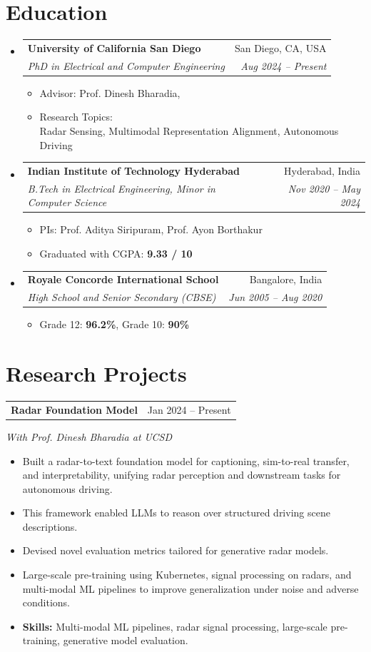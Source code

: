 \documentclass[10pt, letterpaper]{article}
\makeatletter
\newenvironment{highlights}{
    \begin{itemize}[
        topsep=0.10 cm,
        parsep=0.10 cm,
        partopsep=0pt,
        itemsep=0pt,
        leftmargin=0.4 cm + 10pt
    ]
}{
    \end{itemize}
} %
\let\hrefWithoutArrow\href
\renewcommand{\href}[2]{\hrefWithoutArrow{#1}{\ifthenelse{\equal{#2}{}}{ }{#2 }\raisebox{.15ex}{\footnotesize \faExternalLink*}}}
\newcommand{\eduHeading}[4]{
  \item
  \begin{tabular*}{0.97\textwidth}[t]{l@{\extracolsep{\fill}}r}
    \textbf{#1} & #2 \\
    \textit{\small#3} & \textit{\small #4} \\
  \end{tabular*}
}
\newcommand{\eduItemListStart}{
  \begin{itemize}[leftmargin=0.35in, itemsep=0pt, topsep=2pt]
}
\newcommand{\eduItemListEnd}{\end{itemize}}
\newenvironment{projectentry}[3]{%
  \onecolentry
  \begin{tabular*}{\textwidth}{@{\extracolsep{\fill}} l r}
    \textbf{#1} & #2 \\
  \end{tabular*}
  \textit{#3} \par
  \vspace{0.2em} %
}{%
  \endonecolentry
}
\makeatother
\begin{document}
\section{Education}
  \begin{itemize}[leftmargin=0.15in, label={}]

    \eduHeading
        {University of California San Diego}{San Diego, CA, USA}
        {PhD in Electrical and Computer Engineering}{Aug 2024 -- Present}
    \eduItemListStart
        \item Advisor: Prof. Dinesh Bharadia, \href{https://wcsng.ucsd.edu/}{WCSNG Lab}
        \item {
            Research Topics: \\
            Radar Sensing, Multimodal Representation Alignment, Autonomous Driving
        }
    \eduItemListEnd

    \eduHeading
        {Indian Institute of Technology Hyderabad}{Hyderabad, India}
        {B.Tech in Electrical Engineering, Minor in Computer Science}{Nov 2020 -- May 2024}
    \eduItemListStart
        \item PIs: Prof. Aditya Siripuram, Prof. Ayon Borthakur
        \item Graduated with CGPA: \textbf{9.33 / 10}
    \eduItemListEnd

    \eduHeading
        {Royale Concorde International School}{Bangalore, India}
        {High School and Senior Secondary (CBSE)}{Jun 2005 -- Aug 2020}
    \eduItemListStart
        \item Grade 12: \textbf{96.2\%}, Grade 10: \textbf{90\%}
    \eduItemListEnd

  \end{itemize}


\section{Research Projects}

\begin{projectentry}{Radar Foundation Model}{Jan 2024 -- Present}{With Prof. Dinesh Bharadia at UCSD}
    \begin{highlights}
        \item Built a radar-to-text foundation model for captioning, sim-to-real transfer, and interpretability, unifying radar perception and downstream tasks for autonomous driving.
        \item This framework enabled LLMs to reason over structured driving scene descriptions.
        \item Devised novel evaluation metrics tailored for generative radar models.
        \item Large-scale pre-training using Kubernetes, signal processing on radars, and multi-modal ML pipelines to improve generalization under noise and adverse conditions.
        \item \textbf{Skills:} Multi-modal ML pipelines, radar signal processing, large-scale pre-training, generative model evaluation.
    \end{highlights}
\end{projectentry}
\end{document}
